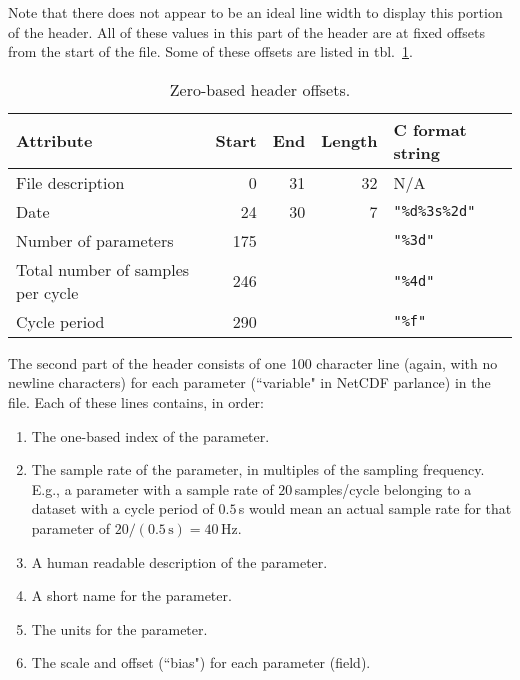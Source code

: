 \documentclass{report}
\begin{document}
Note that there does not appear to be an ideal line width to display this portion of the header. All of these values in this part of the header are at fixed offsets from the start of the file. Some of these offsets are listed in tbl.~\ref{Tbl.HeaderOffsets}.

\begin{table}[H]
\centering
\caption{Zero-based header offsets.}
\label{Tbl.HeaderOffsets}
\begin{tabular}{lrrrl}
Attribute                         & Start & End & Length & C format string \\
\hline
File description                  & 0     & 31  & 32     & N/A \\
Date                              & 24    & 30  & 7      & \texttt{"\%d\%3s\%2d"} \\
Number of parameters              & 175   &     &        & \texttt{"\%3d"} \\
Total number of samples per cycle & 246   &     &        & \texttt{"\%4d"} \\
Cycle period                      & 290   &     &        & \texttt{"\%f"}
\end{tabular}
\end{table}

The second part of the header consists of one 100 character line (again, with no newline characters) for each parameter (``variable" in NetCDF parlance) in the file. Each of these lines contains, in order:
\begin{enumerate}
	\item The one-based index of the parameter.
	\item The sample rate of the parameter, in multiples of the sampling
	      frequency. E.g., a parameter with a sample rate of
	      \(20\)\,samples/cycle belonging to a dataset with a cycle period
	      of \(0.5\)\,s would mean an actual
	      sample rate for that parameter of \(20/(0.5\,\mathrm{s}) = 40\,\text{Hz}\).
	\item A human readable description of the parameter.
	\item A short name for the parameter.
	\item The units for the parameter.
	\item The scale and offset (``bias") for each parameter (field).
\end{enumerate}
\end{document}
